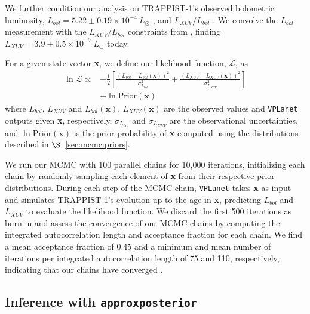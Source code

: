 \documentclass[twocolumn]{aastex62}
\newcommand{\vplanet}[0]{\texttt{VPLanet}\xspace}
\newcommand{\approxposterior}[0]{\texttt{approxposterior}\xspace}
\begin{document}
We further condition our analysis on TRAPPIST-1's observed bolometric luminosity, $L_{bol} = 5.22 \pm{0.19} \times 10^{-4} \ L_{\odot}$ \citep{vanGrootel2018}, and $L_{XUV}/L_{bol}$ \citep{Wheatley2017}. We convolve the \citet{vanGrootel2018} $L_{bol}$ measurement with the $L_{XUV}/L_{bol}$ constraints from \citet{Wheatley2017}, finding $L_{XUV} = 3.9 \pm{0.5} \times 10^{-7} \ L_{\odot}$ today.

For a given state vector \textbf{x}, we define our likelihood function, $\mathcal{L}$, as
\small
\begin{equation} \label{eqn:lnlike}
\begin{split}
    \ln \mathcal{L} \propto & -\frac{1}{2} \left[ \frac{(L_{bol} - L_{bol}(\textbf{x}))^2}{\sigma_{L_{bol}}^2} + \frac{(L_{XUV} - L_{XUV}(\textbf{x}))^2}{\sigma_{L_{XUV}}^2} \right] \\
    & + \ln \mathrm{Prior}(\textbf{x})
\end{split}
\end{equation}
\normalsize
where $L_{bol}$, $L_{XUV}$ and $L_{bol}(\textbf{x})$, $L_{XUV}(\textbf{x})$ are the observed values and \vplanet outputs given \textbf{x}, respectively, $\sigma_{L_{bol}}$ and $\sigma_{L_{XUV}}$ are the observational uncertainties, and $\ln \mathrm{Prior}(\textbf{x})$ is the prior probability of \textbf{x} computed using the distributions described in $\S$~\ref{sec:mcmc:priors}. 

We run our MCMC with 100 parallel chains for 10,000 iterations, initializing each chain by randomly sampling each element of \textbf{x} from their respective prior distributions. During each step of the MCMC chain, \vplanet takes \textbf{x} as input and simulates TRAPPIST-1's evolution up to the age in \textbf{x}, predicting $L_{bol}$ and $L_{XUV}$ to evaluate the likelihood function. We discard the first 500 iterations as burn-in and assess the convergence of our MCMC chains by computing the integrated autocorrelation length and acceptance fraction for each chain. We find a mean acceptance fraction of 0.45 and a minimum and mean number of iterations per integrated autocorrelation length of 75 and 110, respectively, indicating that our chains have converged \citep{ForemanMackey2013}.

\subsection{Inference with \approxposterior} \label{sec:methods:approx}
\end{document}
